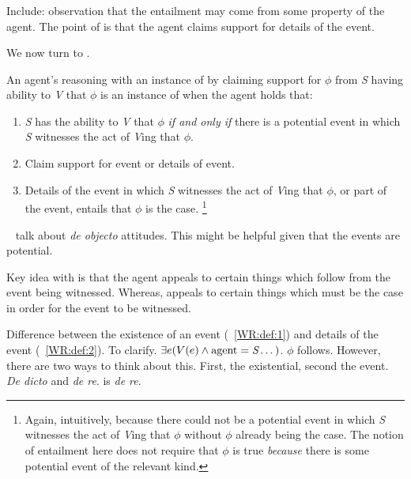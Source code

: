 \subsubsection{\WR{}}
\label{sec:wr-1}

\begin{note}[\WR{} def.]
  {
    \color{red}
    Include: observation that the entailment may come from some property of the agent.
    The point of \WR{} is that the agent claims support for details of the event.
  }

  We now turn to \WR{}.
  \begin{definition}[\WR{}]\label{WR:def}
        An agent's reasoning with an instance of  by claiming support for \(\phi\) from \emph{S} having ability to \emph{V} that \(\phi\) is an instance of \emph{\WR{}} when the agent holds that:
    \begin{enumerate}
    \item\label{WR:def:1} \emph{S} has the ability to \emph{V} that \(\phi\) \emph{if and only if} there is a potential event in which \emph{S} witnesses the act of \emph{V}ing that \(\phi\).
    \item\label{WR:def:2} Claim support for event or details of event.
    \item\label{WR:def:3} Details of the event in which \emph{S} witnesses the act of \emph{V}ing that \(\phi\), or part of the event, entails that \(\phi\) is the case.\nolinebreak
      \footnote{Again, intuitively, because there could not be a potential event in which \emph{S} witnesses the act of \emph{V}ing that \(\phi\) without \(\phi\) already being the case.
      The notion of entailment here does not require that \(\phi\) is true \emph{because} there is some potential event of the relevant kind.}
    \end{enumerate}
  \end{definition}

  {
    \color{red}
    ~\textcite{Rebuschi:2011ub} talk about \emph{de objecto} attitudes.
    This might be helpful given that the events are potential.
  }

  {
    \color{red}
    Key idea with \WR{} is that the agent appeals to certain things which follow from the event being witnessed.
    Whereas, \AR{} appeals to certain things which must be the case in order for the event to be witnessed.
  }

  {
    \color{red}
    Difference between the existence of an event (~\ref{WR:def:1}) and details of the event (~\ref{WR:def:2}).
    To clarify.
    \(\exists e(V(e) \land \text{agent} = \emph{S} \dots)\).
    \(\phi\) follows.
    However, there are two ways to think about this.
    First, the existential, second the event.
    \emph{De dicto} and \emph{de re}.
    \WR{} is \emph{de re}.

}
\end{note}
